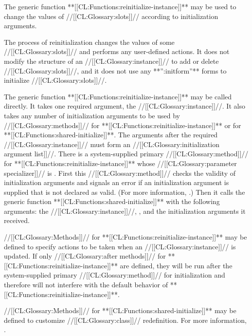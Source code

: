 
                       The generic function **[[CL:Functions:reinitialize-instance]]** may be used to change the values of //[[CL:Glossary:slots]]// according to initialization arguments.

The process of reinitialization changes the values of some //[[CL:Glossary:slots]]// and performs any user-defined actions.  It does not modify the structure of an //[[CL:Glossary:instance]]// to add or delete //[[CL:Glossary:slots]]//,  and it does not use any **'':initform''** forms to initialize //[[CL:Glossary:slots]]//.

The generic function **[[CL:Functions:reinitialize-instance]]** may be called directly.  It takes one required argument, the //[[CL:Glossary:instance]]//.  It also takes any number of initialization arguments to be used by //[[CL:Glossary:methods]]// for **[[CL:Functions:reinitialize-instance]]** or for **[[CL:Functions:shared-initialize]]**. The arguments after the required //[[CL:Glossary:instance]]// must form an  //[[CL:Glossary:initialization argument list]]//.
                                                There is a system-supplied primary //[[CL:Glossary:method]]// for  **[[CL:Functions:reinitialize-instance]]** whose //[[CL:Glossary:parameter specializer]]// is  .  First this //[[CL:Glossary:method]]// checks the validity of initialization arguments and signals an error if an initialization argument is supplied that is not declared as valid.  (For more information, \seesection\DeclaringInitargValidity.) Then it calls the generic function  **[[CL:Functions:shared-initialize]]** with the following arguments: the //[[CL:Glossary:instance]]//, \nil, and the initialization arguments it received.


//[[CL:Glossary:Methods]]// for **[[CL:Functions:reinitialize-instance]]** may be defined to specify actions to be taken when an //[[CL:Glossary:instance]]// is updated.  If only //[[CL:Glossary:after methods]]// for **[[CL:Functions:reinitialize-instance]]** are defined,  they will be run after the system-supplied primary //[[CL:Glossary:method]]// for  initialization and therefore will not interfere with the default behavior of  **[[CL:Functions:reinitialize-instance]]**.

//[[CL:Glossary:Methods]]// for **[[CL:Functions:shared-initialize]]** may be defined to customize  //[[CL:Glossary:class]]// redefinition.  For more information, \seesection\SharedInitialize.

\endsubsection%

